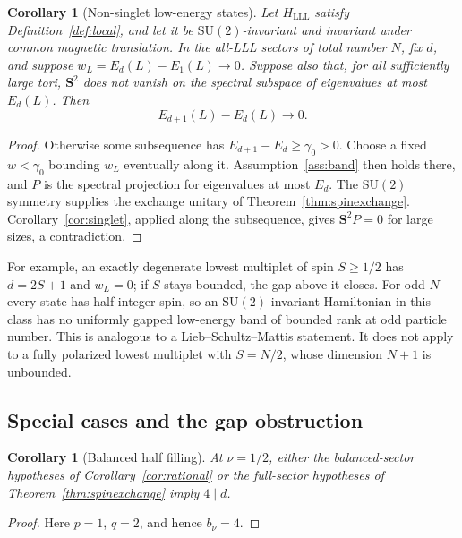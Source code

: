 \documentclass[11pt]{article}
\newtheorem{corollary}[theorem]{Corollary}
\theoremstyle{definition}
\theoremstyle{remark}
\begin{document}
\begin{corollary}[Non-singlet low-energy states]\label{cor:nonsinglet}
Let \(H_{\mathrm{LLL}}\) satisfy Definition~\ref{def:local}, and let
it be \(\mathrm{SU}(2)\)-invariant and invariant under common
magnetic translation.  In the all-LLL sectors of total number \(N\),
fix \(d\), and
suppose \(w_L=E_d(L)-E_1(L)\to0\).  Suppose also that, for all
sufficiently large tori, \(\bm S^2\) does not vanish on the spectral
subspace of eigenvalues at most \(E_d(L)\).  Then
\[
 E_{d+1}(L)-E_d(L)\longrightarrow0.
\]
\end{corollary}
\begin{proof}
Otherwise some subsequence has \(E_{d+1}-E_d\ge\gamma_0>0\).
Choose a fixed \(w<\gamma_0\) bounding \(w_L\) eventually along
it.  Assumption~\ref{ass:band} then holds there, and \(P\) is the
spectral projection for eigenvalues at most \(E_d\).  The
\(\mathrm{SU}(2)\) symmetry supplies the exchange unitary of
Theorem~\ref{thm:spinexchange}.  Corollary~\ref{cor:singlet},
applied along the subsequence, gives \(\bm S^2P=0\) for large sizes,
a contradiction.
\end{proof}

For example, an exactly degenerate lowest multiplet of spin
\(S\ge1/2\) has \(d=2S+1\) and \(w_L=0\); if \(S\) stays bounded,
the gap above it closes.  For odd \(N\) every state has
half-integer spin, so an \(\mathrm{SU}(2)\)-invariant Hamiltonian in
this class has no uniformly gapped low-energy band of bounded rank
at odd particle number.  This is analogous to a
Lieb--Schultz--Mattis statement.  It does not apply to a fully
polarized lowest multiplet with \(S=N/2\), whose dimension \(N+1\)
is unbounded.

\subsection{Special cases and the gap obstruction}

\begin{corollary}[Balanced half filling]\label{cor:four}
At \(\nu=1/2\), either the balanced-sector hypotheses of
Corollary~\ref{cor:rational} or the full-sector hypotheses of
Theorem~\ref{thm:spinexchange} imply \(4\mid d\).
\end{corollary}
\begin{proof}
Here \(p=1\), \(q=2\), and hence \(b_\nu=4\).
\end{proof}
\end{document}
